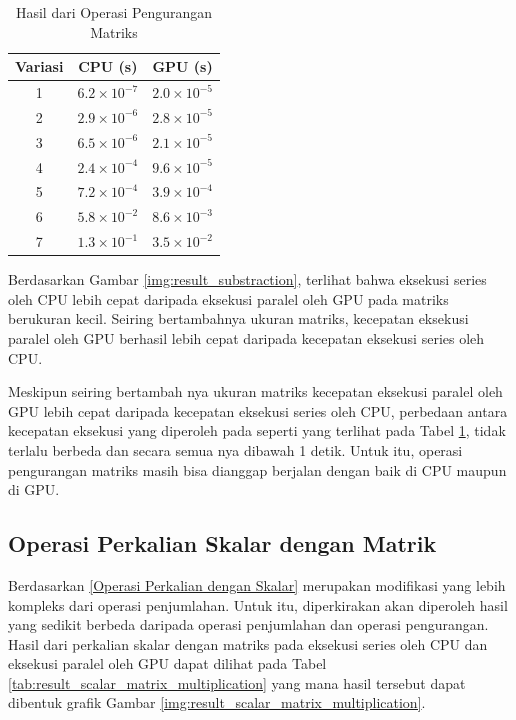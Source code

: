 \begin{table}[H]
	\centering
	\caption{Hasil dari Operasi Pengurangan Matriks}
	\label{tab:result_substraction}
	\begin{tabular}{ccc}
		\toprule
		Variasi & CPU (s)              & GPU (s)              \\
		\midrule
		1       & $6.2 \times 10^{-7}$ & $2.0 \times 10^{-5}$ \\
		2       & $2.9 \times 10^{-6}$ & $2.8 \times 10^{-5}$ \\
		3       & $6.5 \times 10^{-6}$ & $2.1 \times 10^{-5}$ \\
		4       & $2.4 \times 10^{-4}$ & $9.6 \times 10^{-5}$ \\
		5       & $7.2 \times 10^{-4}$ & $3.9 \times 10^{-4}$ \\
		6       & $5.8 \times 10^{-2}$ & $8.6 \times 10^{-3}$ \\
		7       & $1.3 \times 10^{-1}$ & $3.5 \times 10^{-2}$ \\
		\bottomrule
	\end{tabular}
\end{table}

Berdasarkan Gambar \ref{img:result_substraction}, terlihat bahwa eksekusi series oleh CPU lebih cepat daripada eksekusi paralel oleh GPU pada matriks berukuran kecil. Seiring bertambahnya ukuran matriks, kecepatan eksekusi paralel oleh GPU berhasil lebih cepat daripada kecepatan eksekusi series oleh CPU.

Meskipun seiring bertambah nya ukuran matriks kecepatan eksekusi paralel oleh GPU lebih cepat daripada kecepatan eksekusi series oleh CPU, perbedaan antara kecepatan eksekusi yang diperoleh pada seperti yang terlihat pada Tabel \ref{tab:result_substraction}, tidak terlalu berbeda dan secara semua nya dibawah 1 detik. Untuk itu, operasi pengurangan matriks masih bisa dianggap berjalan dengan baik di CPU maupun di GPU.

\subsection{Operasi Perkalian Skalar dengan Matrik}

Berdasarkan \ref{Operasi Perkalian dengan Skalar} merupakan modifikasi yang lebih kompleks dari operasi penjumlahan. Untuk itu, diperkirakan akan diperoleh hasil yang sedikit berbeda daripada operasi penjumlahan dan operasi pengurangan. Hasil dari perkalian skalar dengan matriks pada eksekusi series oleh CPU dan eksekusi paralel oleh GPU dapat dilihat pada Tabel \ref{tab:result_scalar_matrix_multiplication} yang mana hasil tersebut dapat dibentuk grafik Gambar \ref{img:result_scalar_matrix_multiplication}.


